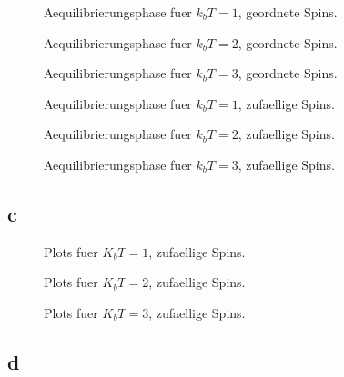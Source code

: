 \documentclass{scrartcl}
\begin{document}
\begin{figure}[ht]
  \centering
  \caption{Aequilibrierungsphase fuer $k_b T = 1$, geordnete Spins.}
\end{figure}
\begin{figure}[ht]
  \centering
  \caption{Aequilibrierungsphase fuer $k_b T = 2$, geordnete Spins.}
\end{figure}
\begin{figure}[ht]
  \centering
  \caption{Aequilibrierungsphase fuer $k_b T = 3$, geordnete Spins.}
\end{figure}
\begin{figure}[ht]
  \centering
  \caption{Aequilibrierungsphase fuer $k_b T = 1$, zufaellige Spins.}
\end{figure}
\begin{figure}[ht]
  \centering
  \caption{Aequilibrierungsphase fuer $k_b T = 2$, zufaellige Spins.}
\end{figure}
\begin{figure}[ht]
  \centering
  \caption{Aequilibrierungsphase fuer $k_b T = 3$, zufaellige Spins.}
\end{figure}
\subsection*{c}
\begin{figure}[ht]
  \centering
  \caption{Plots fuer $K_b T = 1$, zufaellige Spins.}
\end{figure}
\begin{figure}[ht]
  \centering
  \caption{Plots fuer $K_b T = 2$, zufaellige Spins.}
\end{figure}
\begin{figure}[ht]
  \centering
  \caption{Plots fuer $K_b T = 3$, zufaellige Spins.}
\end{figure}
\subsection*{d}
\end{document}
